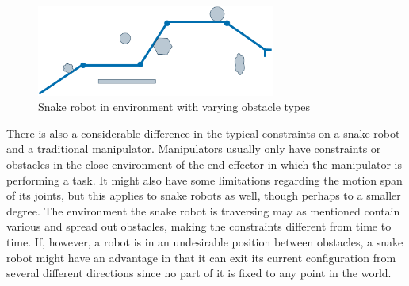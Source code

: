 \begin{figure}
    \centering
    \includegraphics[width=0.7\textwidth]{figures/theory/weird-environment.pdf}
    \caption{Snake robot in environment with varying obstacle types}
    \label{fig:weird-env}
\end{figure}

There is also a considerable difference in the typical constraints on a snake robot and a traditional manipulator. Manipulators usually only have constraints or obstacles in the close environment of the end effector in which the manipulator is performing a task. It might also have some limitations regarding the motion span of its joints, but this applies to snake robots as well, though perhaps to a smaller degree. The environment the snake robot is traversing may as mentioned contain various and spread out obstacles, making the constraints different from time to time. If, however, a robot is in an undesirable position between obstacles, a snake robot might have an advantage in that it can exit its current configuration from several different directions since no part of it is fixed to any point in the world.


